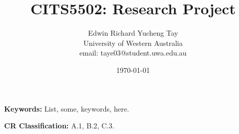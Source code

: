 \documentclass[12pt, a4paper, titlepage]{article}
\title{CITS5502: Research Project}
\author{Edwin Richard Yucheng Tay \\
University of Western Australia \\
email: taye03@student.uwa.edu.au }
\date{\today}
\begin{document}
\maketitle



{\bf Keywords:} List, some, keywords, here.

{\bf CR Classification:} A.1, B.2, C.3.

\pagebreak

\tableofcontents





\appendix




\end{document}

